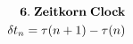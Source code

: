 \documentclass[preview]{standalone}
\begin{document}
\begin{align*}
\special{dvisvgm:raw <g id='unique000'>}\mathbf{6.\;Zeitkorn\;Clock}\\\delta t_n=\tau(n+1)-\tau(n)\special{dvisvgm:raw </g>}
\end{align*}
\end{document}
